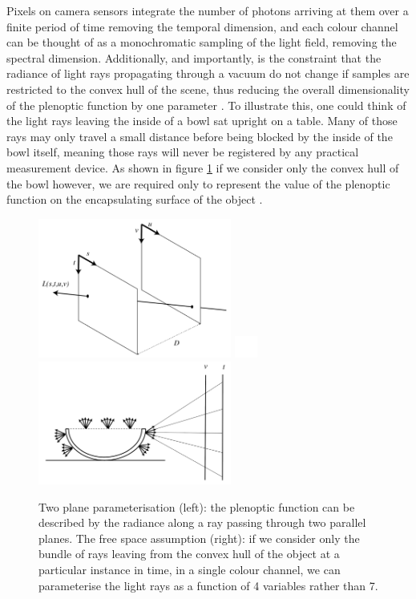 \documentclass[openany]{book}
\begin{document}
Pixels on camera sensors integrate the number of photons arriving at them over a finite period of time removing the temporal dimension, and each colour channel can be thought of as a monochromatic sampling of the light field, removing the spectral dimension. Additionally, and importantly, is the constraint that the radiance of light rays propagating through a vacuum do not change if samples are restricted to the convex hull of the scene, thus reducing the overall dimensionality of the plenoptic function by one parameter \cite{levoy1996lfrendering}. To illustrate this, one could think of the light rays leaving the inside of a bowl sat upright on a table. Many of those rays may only travel a small distance before being blocked by the inside of the bowl itself, meaning those rays will never be registered by any practical measurement device. As shown in figure \ref{convexhull} if we consider only the convex hull of the bowl however, we are required only to represent the value of the plenoptic function on the encapsulating surface of the object \cite{gortler1996lumigraph}.

\begin{figure}[htbp]
    \centering
    \includegraphics[width=2.5in]{images/2pp.png}
    \includegraphics[width=0.3in]{images/blank.png}
    \includegraphics[width=2.5in]{images/convexhull.png}
    
    \caption{Two plane parameterisation (left): the plenoptic function can be described by the radiance along a ray passing through two parallel planes. The free space assumption (right): if we consider only the bundle of rays leaving from the convex hull of the object at a particular instance in time, in a single colour channel, we can parameterise the light rays as a function of 4 variables rather than 7.}
    
    \label{convexhull}
\end{figure}
\end{document}
